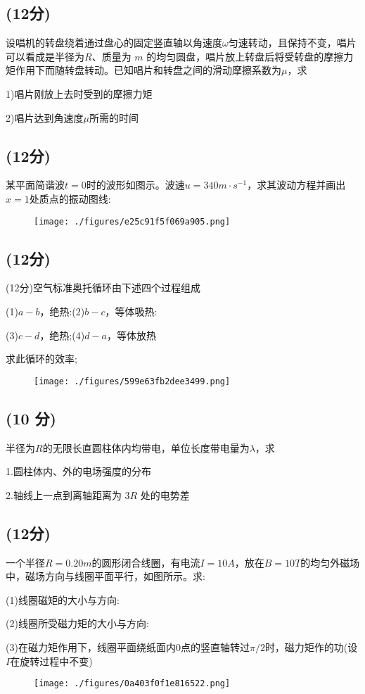 \subsection{(12分)}
设唱机的转盘绕着通过盘心的固定竖直轴以角速度$\omega$匀速转动，且保持不变，唱片可以看成是半径为$R$、质量为 $m$ 的均匀圆盘，唱片放上转盘后将受转盘的摩擦力矩作用下而随转盘转动。已知唱片和转盘之间的滑动摩擦系数为$\mu$，求

1)唱片刚放上去时受到的摩擦力矩

2)唱片达到角速度$\mu$所需的时间
\subsection{(12分)}
某平面简谐波$t=0$时的波形如图示。波速$u=340m\cdot s^{-1}$，求其波动方程并画出$x=1$处质点的振动图线:
\begin{figure}[ht]
\centering
\texttt{[image: ./figures/e25c91f5f069a905.png]}
\caption{} \label{fig_NJU07_4}
\end{figure}
\subsection{(12分)}
(12分)空气标准奥托循环由下述四个过程组成

(1)$a-b$，绝热:(2)$b-c$，等体吸热:

(3)$c-d$，绝热;(4)$d-a$，等体放热

求此循环的效率;
\begin{figure}[ht]
\centering
\texttt{[image: ./figures/599e63fb2dee3499.png]}
\caption{} \label{fig_NJU07_5}
\end{figure}
\subsection{(10 分)}
半径为$R$的无限长直圆柱体内均带电，单位长度带电量为$\lambda$，求

1.圆柱体内、外的电场强度的分布

2.轴线上一点到离轴距离为 $3R$ 处的电势差
\subsection{(12分)}
一个半径$R=0.20m$的圆形闭合线圈，有电流$I=10A$，放在$B=10T$的均匀外磁场中，磁场方向与线圈平面平行，如图所示。求:

(1)线圈磁矩的大小与方向:

(2)线圈所受磁力矩的大小与方向:

(3)在磁力矩作用下，线圈平面绕纸面内0点的竖直轴转过$\pi/2$时，磁力矩作的功(设$I$在旋转过程中不变)
\begin{figure}[ht]
\centering
\texttt{[image: ./figures/0a403f0f1e816522.png]}
\caption{} \label{fig_NJU07_7}
\end{figure}
